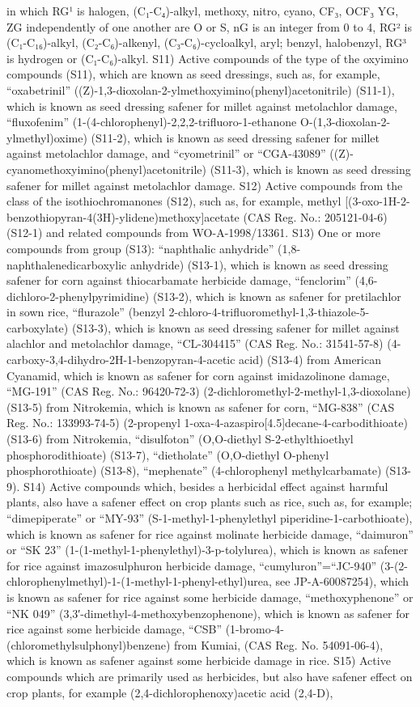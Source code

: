 \documentclass[11pt,a4paper]{article}
\begin{document}
in which RG¹ is halogen, (C₁-C₄)-alkyl, methoxy, nitro, cyano, CF₃, OCF₃ YG, ZG independently of one another are O or S, nG is an integer from 0 to 4, RG² is (C₁-C₁₆)-alkyl, (C₂-C₆)-alkenyl, (C₃-C₆)-cycloalkyl, aryl; benzyl, halobenzyl, RG³ is hydrogen or (C₁-C₆)-alkyl. S11) Active compounds of the type of the oxyimino compounds (S11), which are known as seed dressings, such as, for example, “oxabetrinil” ((Z)-1,3-dioxolan-2-ylmethoxyimino(phenyl)acetonitrile) (S11-1), which is known as seed dressing safener for millet against metolachlor damage, “fluxofenim” (1-(4-chlorophenyl)-2,2,2-trifluoro-1-ethanone O-(1,3-dioxolan-2-ylmethyl)oxime) (S11-2), which is known as seed dressing safener for millet against metolachlor damage, and “cyometrinil” or “CGA-43089” ((Z)-cyanomethoxyimino(phenyl)acetonitrile) (S11-3), which is known as seed dressing safener for millet against metolachlor damage. S12) Active compounds from the class of the isothiochromanones (S12), such as, for example, methyl [(3-oxo-1H-2-benzothiopyran-4(3H)-ylidene)methoxy]acetate (CAS Reg. No.: 205121-04-6) (S12-1) and related compounds from WO-A-1998/13361. S13) One or more compounds from group (S13): “naphthalic anhydride” (1,8-naphthalenedicarboxylic anhydride) (S13-1), which is known as seed dressing safener for corn against thiocarbamate herbicide damage, “fenclorim” (4,6-dichloro-2-phenylpyrimidine) (S13-2), which is known as safener for pretilachlor in sown rice, “flurazole” (benzyl 2-chloro-4-trifluoromethyl-1,3-thiazole-5-carboxylate) (S13-3), which is known as seed dressing safener for millet against alachlor and metolachlor damage, “CL-304415” (CAS Reg. No.: 31541-57-8) (4-carboxy-3,4-dihydro-2H-1-benzopyran-4-acetic acid) (S13-4) from American Cyanamid, which is known as safener for corn against imidazolinone damage, “MG-191” (CAS Reg. No.: 96420-72-3) (2-dichloromethyl-2-methyl-1,3-dioxolane) (S13-5) from Nitrokemia, which is known as safener for corn, “MG-838” (CAS Reg. No.: 133993-74-5) (2-propenyl 1-oxa-4-azaspiro[4.5]decane-4-carbodithioate) (S13-6) from Nitrokemia, “disulfoton” (O,O-diethyl S-2-ethylthioethyl phosphorodithioate) (S13-7), “dietholate” (O,O-diethyl O-phenyl phosphorothioate) (S13-8), “mephenate” (4-chlorophenyl methylcarbamate) (S13-9). S14) Active compounds which, besides a herbicidal effect against harmful plants, also have a safener effect on crop plants such as rice, such as, for example; “dimepiperate” or “MY-93” (S-1-methyl-1-phenylethyl piperidine-1-carbothioate), which is known as safener for rice against molinate herbicide damage, “daimuron” or “SK 23” (1-(1-methyl-1-phenylethyl)-3-p-tolylurea), which is known as safener for rice against imazosulphuron herbicide damage, “cumyluron”=“JC-940” (3-(2-chlorophenylmethyl)-1-(1-methyl-1-phenyl-ethyl)urea, see JP-A-60087254), which is known as safener for rice against some herbicide damage, “methoxyphenone” or “NK 049” (3,3′-dimethyl-4-methoxybenzophenone), which is known as safener for rice against some herbicide damage, “CSB” (1-bromo-4-(chloromethylsulphonyl)benzene) from Kumiai, (CAS Reg. No. 54091-06-4), which is known as safener against some herbicide damage in rice. S15) Active compounds which are primarily used as herbicides, but also have safener effect on crop plants, for example (2,4-dichlorophenoxy)acetic acid (2,4-D), 
\end{document}
